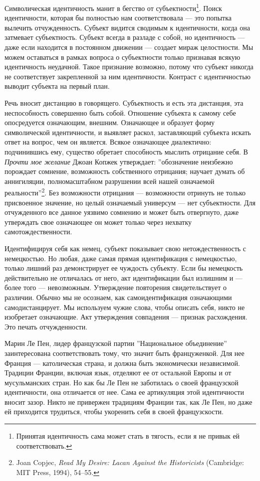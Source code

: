 \documentclass[12pt]{book}
\begin{document}
Символическая идентичность манит в бегство от субъектности\footnote{Принятая идентичность сама может стать в тягость, если я не привык ей соответствовать.}. Поиск идентичности, которая бы полностью нам соответствовала --- это попытка вылечить отчужденность. Субъект видится сводимым к идентичности, когда она затмевает субъектность. Субъект всегда в разладе с собой, но идентичность --- даже если находится в постоянном движении --- создает мираж целостности. Мы можем оставаться в рамках вопроса о субъектности только признавая всякую идентичность неудачной. Такое признание возможно, потому что субъект никогда не соответствует закрепленной за ним идентичности. Контраст с идентичностью выводит субъекта на первый план.

Речь вносит дистанцию в говорящего. Субъектность и есть эта дистанция, эта неспособность совершенно быть собой. Отношение субъекта к самому себе опосредуется означающим, внешним. Означающее и образует форму символической идентичности, и выявляет раскол, заставляющий субъекта искать ответ на вопрос, чем он является. Всякое означающее диалектично: подчинившись ему, существо обретает способность мыслить отрицание себя. В \textit{Прочти мое желание} Джоан Копжек утверждает: ''обозначение неизбежно порождает сомнение, возможность собственного отрицания; научает думать об аннигиляции, полномасштабном разрушении всей нашей означаемой реальности''\footnote{Joan Copjec, \textit{Read My Desire: Lacan Against the Historicists} (Cambridge: MIT Press, 1994), 54–55.}. Без возможности отрицания --- возможности отринуть не только присвоенное значение, но целый означаемый универсум --- нет субъектности. Для отчужденного все данное уязвимо сомнению и может быть отвергнуто, даже утверждать свое означающее он может только через нехватку самотождественности.

Идентифицируя себя как немец, субъект показывает свою нетождественность с немецкостью. Но любая, даже самая прямая идентификация с немецкостью, только лишний раз демонстрирует ее чуждость субъекту. Если бы немецкость действительно не отличалась от него, акт идентификации был излишним и --- более того --- невозможным. Утверждение повторения свидетельствует о различии. Обычно мы не осознаем, как самоидентификация означающими самодистанцирует. Мы используем чужие слова, чтобы описать себя, никто не изобретает означающие. Акт утверждения совпадения --- признак расхождения. Это печать отчужденности.

Марин Ле Пен, лидер французской партии ''Национальное объединение'' заинтересована соответствовать тому, что значит быть француженкой. Для нее Франция --- католическая страна, и должна быть экономически независимой. Традиции Франции, включая язык, отделяют ее от остальной Европы и от мусульманских стран. Но как бы Ле Пен не заботилась о своей французской идентичности, она отличается от нее. Сама ее артикуляция этой идентичности вносит зазор. Никто не привержен традициям Франции так, как Ле Пен, но даже ей приходится трудиться, чтобы укоренить себя в своей французскости.
\end{document}
